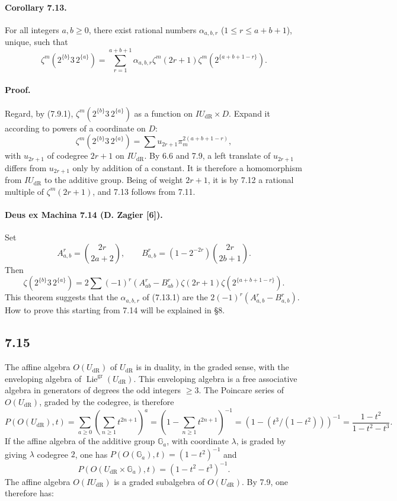 \documentclass[11pt]{article}
\newcommand{\Ga}{\mathbb G_a}
\newcommand{\Lie}{\operatorname{Lie}}
\newcommand{\dR}{\mathrm{dR}}
\begin{document}
\paragraph{Corollary 7.13.}
For all integers $a,b\geq0$, there exist rational numbers $\alpha_{a,b,r}$ ($1\leq r\leq a+b+1$), unique, such that
\begin{equation}
 \zeta^m(2^{\{b\}}3\,2^{\{a\}})=
 \sum_{r=1}^{a+b+1}\alpha_{a,b,r}\zeta^m(2r+1)\zeta^m(2^{\{a+b+1-r\}}).
\tag{7.13.1}
\end{equation}

\paragraph{Proof.}
Regard, by (7.9.1), $\zeta^m(2^{\{b\}}3\,2^{\{a\}})$ as a function on $IU_{\dR}\times D$.
Expand it according to powers of a coordinate on $D$:
\[
 \zeta^m(2^{\{b\}}3\,2^{\{a\}})=\sum u_{2r+1}\pi_m^{2(a+b+1-r)},
\]
with $u_{2r+1}$ of codegree $2r+1$ on $IU_{\dR}$.
By 6.6 and 7.9, a left translate of $u_{2r+1}$ differs from $u_{2r+1}$ only by addition of a constant.
It is therefore a homomorphism from $IU_{\dR}$ to the additive group.
Being of weight $2r+1$, it is by 7.12 a rational multiple of $\zeta^m(2r+1)$, and 7.13 follows from 7.11.

\paragraph{Deus ex Machina 7.14 (D. Zagier [6]).}
Set
\[
 A^r_{a,b}=\binom{2r}{2a+2},\qquad
 B^r_{a,b}=(1-2^{-2r})\binom{2r}{2b+1}.
\]
Then
\begin{equation}
 \zeta(2^{\{b\}}3\,2^{\{a\}})=2\sum (-1)^r(A^r_{ab}-B^r_{ab})\zeta(2r+1)\zeta(2^{\{a+b+1-r\}}).
\tag{7.14.1}
\end{equation}
This theorem suggests that the $\alpha_{a,b,r}$ of (7.13.1) are the $2(-1)^r(A^r_{a,b}-B^r_{a,b})$.
How to prove this starting from 7.14 will be explained in \S8.

\subsection*{7.15}
The affine algebra $O(U_{\dR})$ of $U_{\dR}$ is in duality, in the graded sense, with the enveloping algebra of $\Lie^{\mathrm{gr}}(U_{\dR})$.
This enveloping algebra is a free associative algebra in generators of degrees the odd integers $\geq3$.
The Poincare series of $O(U_{\dR})$, graded by the codegree, is therefore
\[
P(O(U_{\dR}),t)=\sum_{a\geq0}\left(\sum_{n\geq1}t^{2n+1}\right)^a
=\left(1-\sum_{n\geq1}t^{2n+1}\right)^{-1}
=(1-(t^3/(1-t^2)))^{-1}=\frac{1-t^2}{1-t^2-t^3}.
\]
If the affine algebra of the additive group $\Ga$, with coordinate $\lambda$, is graded by giving $\lambda$ codegree $2$, one has $P(O(\Ga),t)=(1-t^2)^{-1}$ and
\[
 P(O(U_{\dR}\times\Ga),t)=(1-t^2-t^3)^{-1}.
\]
The affine algebra $O(IU_{\dR})$ is a graded subalgebra of $O(U_{\dR})$.
By 7.9, one therefore has:
\end{document}
